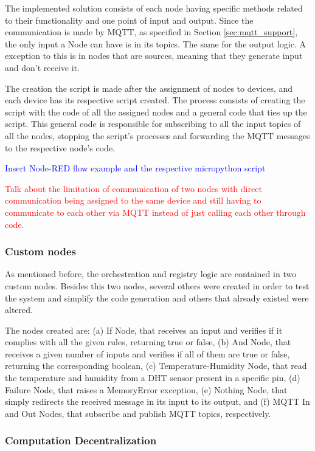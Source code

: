 The implemented solution consists of each node having specific methods related to their functionality and one point of input and output. Since the communication is made by MQTT, as specified in Section \ref{sec:mqtt_support}, the only input a Node can have is in its topics. The same for the output logic. A exception to this is in nodes that are sources, meaning that they generate input and don't receive it. 

The creation the script is made after the assignment of nodes to devices, and each device has its respective script created. The process consists of creating the script with the code of all the assigned nodes and a general code that ties up the script. This general code is responsible for subscribing to all the input topics of all the nodes, stopping the script's processes and forwarding the MQTT messages to the respective node's code.

\textcolor{blue}{Insert Node-RED flow example and the respective micropython script}

\textcolor{red}{Talk about the limitation of communication of two nodes with direct communication being assigned to the same device and still having to communicate to each other via MQTT instead of just calling each other through code.}

\subsubsection{Custom nodes}\label{sec:custom_nodes}

As mentioned before, the orchestration and registry logic are contained in two custom nodes. Besides this two nodes, several others were created in order to test the system and simplify the code generation and others that already existed were altered. 

The nodes created are: (a) If Node, that receives an input and verifies if it complies with all the given rules, returning true or false, (b) And Node, that receives a given number of inputs and verifies if all of them are true or false, returning the corresponding boolean, (c) Temperature-Humidity Node, that read the temperature and humidity from a DHT sensor present in a specific pin, (d) Failure Node, that raises a MemoryError exception, (e) Nothing Node, that simply redirects the received message in its input to its output, and (f) MQTT In and Out Nodes, that subscribe and publish MQTT topics, respectively.

\subsubsection{Computation Decentralization}\label{sec:node_red_computation_decentralization}

